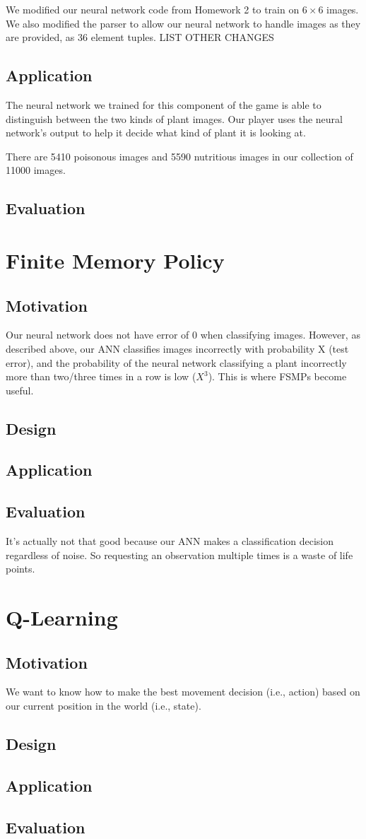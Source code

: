 \documentclass[solution, letterpaper]{cs121}
\begin{document}
We modified our neural network code from Homework 2 to train on $6 \times 6$ images. We also modified the parser to allow our neural network to handle images as they are provided, as 36 element tuples. LIST OTHER CHANGES

\subsection{Application}
The neural network we trained for this component of the game is able to distinguish between the two kinds of plant images. Our player uses the neural network's output to help it decide what kind of plant it is looking at.

There are 5410 poisonous images and 5590 nutritious images in our collection of 11000 images.

\subsection{Evaluation}

\section{Finite Memory Policy}
\subsection{Motivation}
Our neural network does not have error of 0 when classifying images. However, as described above, our ANN classifies images incorrectly with probability X (test error), and the probability of the neural network classifying a plant incorrectly more than two/three times in a row is low ($X^3$). This is where FSMPs become useful.

\subsection{Design}
\subsection{Application}
\subsection{Evaluation}
It's actually not that good because our ANN makes a classification decision regardless of noise. So requesting an observation multiple times is a waste of life points. 

\section{Q-Learning}
\subsection{Motivation}
We want to know how to make the best movement decision (i.e., action) based on our current position in the world (i.e., state).

\subsection{Design}
\subsection{Application}
\subsection{Evaluation}
\end{document}
